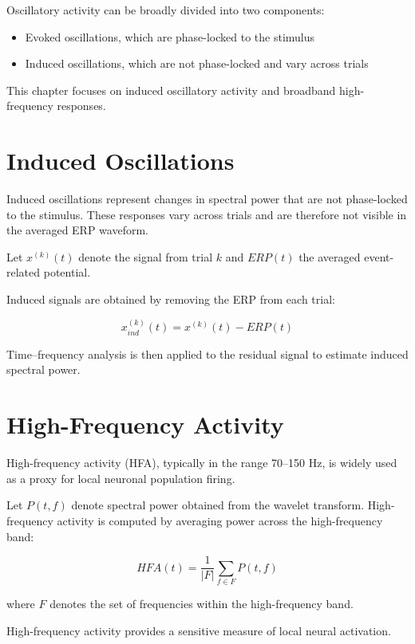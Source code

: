 \documentclass[11pt]{report}
\begin{document}
Oscillatory activity can be broadly divided into two components:

\begin{itemize}
\item Evoked oscillations, which are phase-locked to the stimulus
\item Induced oscillations, which are not phase-locked and vary across trials
\end{itemize}

This chapter focuses on induced oscillatory activity and broadband
high-frequency responses.

\section{Induced Oscillations}

Induced oscillations represent changes in spectral power that are not
phase-locked to the stimulus. These responses vary across trials and
are therefore not visible in the averaged ERP waveform.

Let $x^{(k)}(t)$ denote the signal from trial $k$ and
$ERP(t)$ the averaged event-related potential.

Induced signals are obtained by removing the ERP from each trial:

\begin{equation}
x^{(k)}_{ind}(t) =
x^{(k)}(t) - ERP(t)
\end{equation}

Time--frequency analysis is then applied to the residual signal to
estimate induced spectral power.

\section{High-Frequency Activity}

High-frequency activity (HFA), typically in the range
70--150 Hz, is widely used as a proxy for local neuronal population
firing.

Let $P(t,f)$ denote spectral power obtained from the wavelet transform.
High-frequency activity is computed by averaging power across the
high-frequency band:

\begin{equation}
HFA(t) =
\frac{1}{|F|}
\sum_{f \in F} P(t,f)
\end{equation}

where $F$ denotes the set of frequencies within the high-frequency band.

High-frequency activity provides a sensitive measure of local neural
activation.
\end{document}
